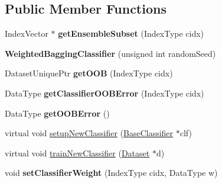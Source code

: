 \subsection*{Public Member Functions}
\begin{DoxyCompactItemize}
\item 
\hypertarget{classffactory_1_1_weighted_bagging_classifier_abbf3f8950f9adfceee5cfae0268a2a1f}{Index\-Vector $\ast$ {\bfseries get\-Ensemble\-Subset} (Index\-Type cidx)}\label{classffactory_1_1_weighted_bagging_classifier_abbf3f8950f9adfceee5cfae0268a2a1f}

\item 
\hypertarget{classffactory_1_1_weighted_bagging_classifier_ad684b7114dbb2e21e43e79836bd5cc5c}{{\bfseries Weighted\-Bagging\-Classifier} (unsigned int random\-Seed)}\label{classffactory_1_1_weighted_bagging_classifier_ad684b7114dbb2e21e43e79836bd5cc5c}

\item 
\hypertarget{classffactory_1_1_weighted_bagging_classifier_a11a47f385b7a304afe763662d8692a25}{Dataset\-Unique\-Ptr {\bfseries get\-O\-O\-B} (Index\-Type cidx)}\label{classffactory_1_1_weighted_bagging_classifier_a11a47f385b7a304afe763662d8692a25}

\item 
\hypertarget{classffactory_1_1_weighted_bagging_classifier_ab73ccec9e74925fc02a041dcf8c649e9}{Data\-Type {\bfseries get\-Classifier\-O\-O\-B\-Error} (Index\-Type cidx)}\label{classffactory_1_1_weighted_bagging_classifier_ab73ccec9e74925fc02a041dcf8c649e9}

\item 
\hypertarget{classffactory_1_1_weighted_bagging_classifier_a1bd1f5ba735324155cb61a83474f4e60}{Data\-Type {\bfseries get\-O\-O\-B\-Error} ()}\label{classffactory_1_1_weighted_bagging_classifier_a1bd1f5ba735324155cb61a83474f4e60}

\item 
virtual void \hyperlink{classffactory_1_1_weighted_bagging_classifier_a4e29b9710c24ecbf3a2f1748b062cce0}{setup\-New\-Classifier} (\hyperlink{classffactory_1_1_base_classifier}{Base\-Classifier} $\ast$clf)
\item 
virtual void \hyperlink{classffactory_1_1_weighted_bagging_classifier_ab6a99cdccca8417c3a9209d1ea3073db}{train\-New\-Classifier} (\hyperlink{classffactory_1_1_dataset}{Dataset} $\ast$d)
\item 
\hypertarget{classffactory_1_1_weighted_bagging_classifier_a024d6487f21e8910ea84efd06a371608}{void {\bfseries set\-Classifier\-Weight} (Index\-Type cidx, Data\-Type w)}\label{classffactory_1_1_weighted_bagging_classifier_a024d6487f21e8910ea84efd06a371608}


\end{DoxyCompactItemize}
